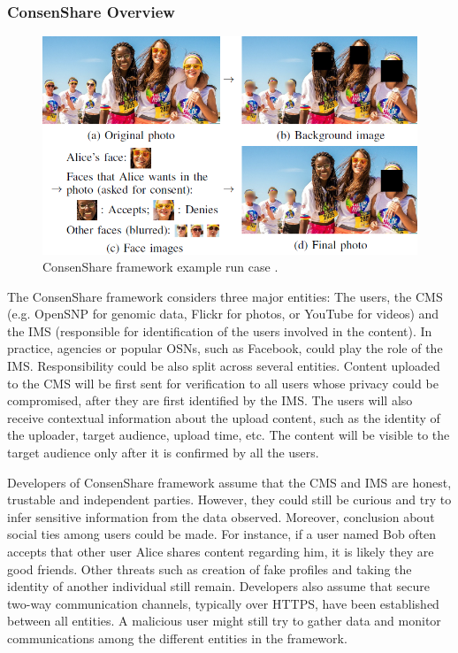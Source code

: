 \documentclass[conference]{IEEEtran}
\begin{document}
\subsubsection{ConsenShare Overview}
\begin{figure}[t]
\centerline{\includegraphics[width=.5\textwidth]{img/consen_example.png}}
\caption{ConsenShare framework example run case \cite{olteanu2018consensual}.}
\label{fig:consen}
\end{figure}
The ConsenShare framework \cite{olteanu2018consensual} considers three major entities: The users, the \ac{CMS} (e.g. OpenSNP for genomic data, Flickr for photos, or YouTube for videos) and the \ac{IMS} (responsible for identification of the users involved in the content). In practice, agencies or popular OSNs, such as Facebook, could play the role of the \ac{IMS}. Responsibility could be also split across several entities. Content uploaded to the CMS will be first sent for verification to all users whose privacy could be compromised, after they are first identified by the \ac{IMS}. The users will also receive contextual information about the upload content, such as the identity of the uploader, target audience, upload time, etc. The content will be visible to the target audience only after it is confirmed by all the users. 

Developers of ConsenShare framework assume that the \ac{CMS} and \ac{IMS} are honest, trustable and independent parties. However, they could still be curious and try to infer sensitive information from the data observed. Moreover, conclusion about social ties among users could be made. For instance, if a user named Bob often accepts that other user Alice shares content regarding him, it is likely they are good friends. Other threats such as creation of fake profiles and taking the identity of another individual still remain. Developers also assume that secure two-way communication channels, typically over HTTPS, have been established between all entities. A malicious user might still try to gather data and monitor communications among the different entities in the framework. 
\end{document}
